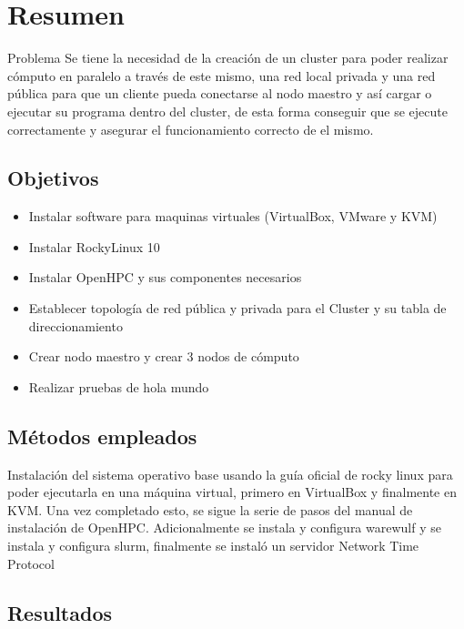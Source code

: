 \section{Resumen}
\label{sec:resumen}

Problema
Se tiene la necesidad de la creación de un cluster para poder realizar cómputo en paralelo a través de este mismo, una red local privada y una red pública para que un cliente pueda conectarse al nodo maestro y así cargar o ejecutar su programa dentro del cluster, de esta forma conseguir que se ejecute correctamente y asegurar el funcionamiento correcto de el mismo.

\subsection{Objetivos}

\begin{itemize}[noitemsep]
  \item Instalar software para maquinas virtuales (VirtualBox, VMware y KVM)
  \item Instalar RockyLinux 10
  \item Instalar OpenHPC y sus componentes necesarios
  \item Establecer topología de red pública y privada para el Cluster y su tabla de direccionamiento 
  \item Crear nodo maestro y crear 3 nodos de cómputo
  \item Realizar pruebas de hola mundo
\end{itemize}

\subsection{Métodos empleados}

Instalación del sistema operativo base usando la guía oficial de rocky linux para poder ejecutarla en una máquina virtual, primero en VirtualBox y finalmente en KVM. Una vez completado esto, se sigue la serie de pasos del manual de instalación de OpenHPC.
Adicionalmente se instala y configura warewulf y se instala y configura slurm, finalmente se instaló un servidor Network Time Protocol

\subsection{Resultados}

